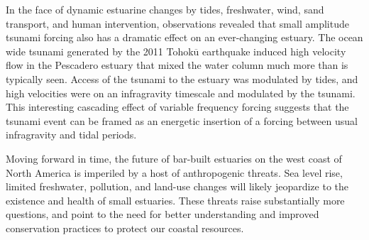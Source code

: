 In the face of dynamic estuarine changes by tides, freshwater, wind, sand transport, and human intervention, observations revealed that small amplitude tsunami forcing also has a dramatic effect on an ever-changing estuary. The ocean wide tsunami generated by the 2011 Tohok$\overline{\mathrm{u}}$ earthquake induced high velocity flow in the Pescadero estuary that mixed the water column much more than is typically seen. Access of the tsunami to the estuary was modulated by tides, and high velocities were on an infragravity timescale and modulated by the tsunami. This interesting cascading effect of variable frequency forcing suggests that the tsunami event can be framed as an energetic insertion of a forcing between usual infragravity and tidal periods.

Moving forward in time, the future of bar-built estuaries on the west coast of North America is imperiled by a host of anthropogenic threats. Sea level rise, limited freshwater, pollution, and land-use changes will likely jeopardize to the existence and health of small estuaries. These threats raise substantially more questions, and point to the need for better understanding and improved conservation practices to protect our coastal resources. 
